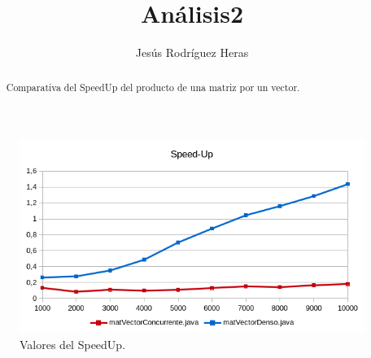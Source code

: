 \documentclass[12pt,letterpaper]{article}
\title{Análisis2}
\author{Jesús Rodríguez Heras}
\begin{document}
	
	\maketitle
	\begin{abstract} %
		\begin{center}
			Comparativa del SpeedUp del producto de una matriz por un vector.
		\end{center}
	\end{abstract}
	\thispagestyle{empty}
	\newpage
	
	\newpage
	
	
	
	
	\lstset{language=bash, numbers=left, numberstyle=\tiny, numbersep=10pt, firstnumber=1, stepnumber=1, basicstyle=\small\ttfamily, tabsize=1, extendedchars=true, inputencoding=latin1}
\newpage
\begin{figure}
	\begin{center}
		\includegraphics[scale=1]{SpeedUp1.png}
		\caption{Valores del SpeedUp.}
		\label{fig:Valores del SpeedUp}
	\end{center}
\end{figure}
\end{document}
